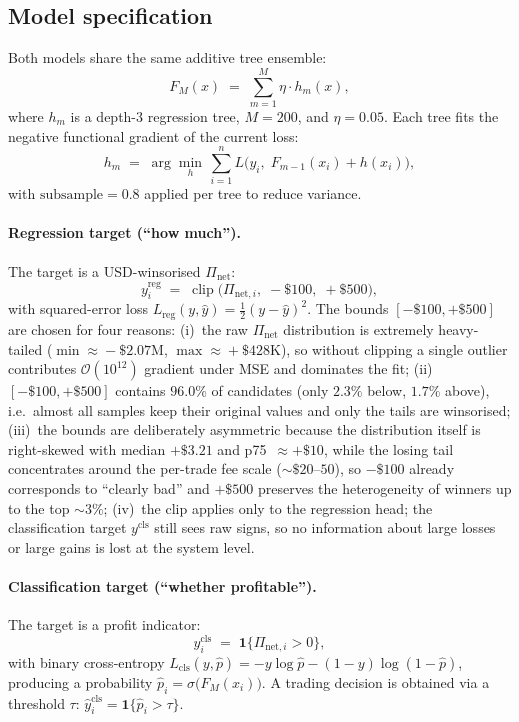 \documentclass[sigconf,nonacm,10pt]{acmart}
\newcommand{\Pnet}{\Pi_{\text{net}}}
\begin{document}
\subsection{Model specification}

Both models share the same additive tree ensemble:
\begin{equation}
F_M(x) \;=\; \sum_{m=1}^{M} \eta \cdot h_m(x),
\label{eq:gbm}
\end{equation}
where $h_m$ is a depth-$3$ regression tree, $M=200$, and
$\eta=0.05$. Each tree fits the negative functional gradient of the
current loss:
\begin{equation}
h_m \;=\; \arg\min_{h}\,\sum_{i=1}^{n}
L\!\bigl(y_i,\; F_{m-1}(x_i)+h(x_i)\bigr),
\label{eq:gbm-update}
\end{equation}
with $\text{subsample}=0.8$ applied per tree to reduce variance.

\paragraph{Regression target (``how much'').}
The target is a USD-winsorised $\Pnet$:
\begin{equation}
y^{\text{reg}}_i \;=\; \operatorname{clip}\!\bigl(\Pi_{\text{net},i},\;
-\$100,\; +\$500\bigr),
\label{eq:reg-target}
\end{equation}
with squared-error loss
$L_{\text{reg}}(y,\hat y)=\tfrac12(y-\hat y)^2$.
The bounds $[-\$100,+\$500]$ are chosen for four reasons:
(i)~the raw $\Pnet$ distribution is extremely heavy-tailed
($\min\!\approx\!-\$2.07\text{M}$, $\max\!\approx\!+\$428\text{K}$),
so without clipping a single outlier contributes $\mathcal{O}(10^{12})$
gradient under MSE and dominates the fit;
(ii)~$[-\$100,+\$500]$ contains $96.0\%$ of candidates
(only $2.3\%$ below, $1.7\%$ above), i.e.\ almost all samples keep
their original values and only the tails are winsorised;
(iii)~the bounds are deliberately asymmetric because the distribution
itself is right-skewed with median $+\$3.21$ and p75~$\approx+\$10$,
while the losing tail concentrates around the per-trade fee scale
($\sim\!\$20$--$50$), so $-\$100$ already corresponds to
``clearly bad'' and $+\$500$ preserves the heterogeneity of winners
up to the top $\sim\!3\%$;
(iv)~the clip applies only to the regression head; the classification
target $y^{\text{cls}}$ still sees raw signs, so no information about
large losses or large gains is lost at the system level.

\paragraph{Classification target (``whether profitable'').}
The target is a profit indicator:
\begin{equation}
y^{\text{cls}}_i \;=\; \mathbf{1}\{\Pi_{\text{net},i}>0\},
\label{eq:cls-target}
\end{equation}
with binary cross-entropy
$L_{\text{cls}}(y,\hat p)=-y\log\hat p-(1-y)\log(1-\hat p)$,
producing a probability
$\hat p_i=\sigma\!\bigl(F_M(x_i)\bigr)$. A trading decision is
obtained via a threshold $\tau$:
$\hat y^{\text{cls}}_i=\mathbf{1}\{\hat p_i>\tau\}$.
\end{document}
